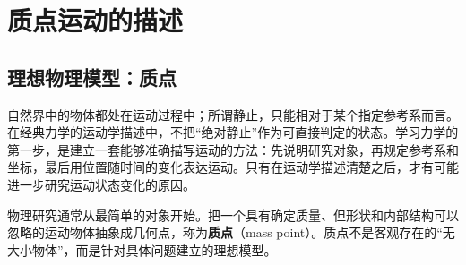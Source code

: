 \begingroup
{}
\chapter{质点运动的描述}

{
\graphicspath{{../../../sample/xes-original/kinematics-supplement/}{../../../sample/xes-original/kinematics-supplement/assets/}}
\section{理想物理模型：质点}
\newcommand{\EarthMoonScaleDiagram}{%
\begin{center}\begin{tikzpicture}[x=1cm,y=1cm,>=Latex]
  \coordinate (E) at (-5.25,0);
  \coordinate (M) at (5.25,0);
  \shade[ball color=Blue!70] (E) circle (.174);
  \shade[ball color=TextGray!45] (M) circle (.048);
  \draw[<->,TextGray] (-5.25,-.45)--(5.25,-.45)
    node[midway,clearlabel,below=2pt]
      {平均中心距 $3.84\times10^5\,\mathrm{km}$};
  \draw[TextGray] (E)--++(-.42,.58);
  \node[clearlabel,above right,align=left] at (-5.72,.55)
    {地球 $R_E\approx6.37\times10^3\,\mathrm{km}$\\$M_E\approx5.97\times10^{24}\,\mathrm{kg}$};
  \draw[TextGray] (M)--++(.35,.58);
  \node[clearlabel,above left,align=right] at (5.67,.55)
    {月球 $R_M\approx1.74\times10^3\,\mathrm{km}$\\$M_M\approx7.35\times10^{22}\,\mathrm{kg}$};
  \node[clearlabel,below] at (0,-1.05)
    {半径与中心距采用同一比例；$M_M/M_E\approx0.0123$};
\end{tikzpicture}\figcap{月球、地球及月地距离的真实比例。研究月球绕地球公转时可把月球近似为质点；研究着陆时则不能。}\label{ch02:fig:k01-2-1}\end{center}}


自然界中的物体都处在运动过程中；所谓静止，只能相对于某个指定参考系而言。在经典力学的运动学描述中，不把“绝对静止”作为可直接判定的状态。学习力学的第一步，是建立一套能够准确描写运动的方法：先说明研究对象，再规定参考系和坐标，最后用位置随时间的变化表达运动。只有在运动学描述清楚之后，才有可能进一步研究运动状态变化的原因。

物理研究通常从最简单的对象开始。把一个具有确定质量、但形状和内部结构可以忽略的运动物体抽象成几何点，称为\textbf{质点}（mass point）。质点不是客观存在的“无大小物体”，而是针对具体问题建立的理想模型。

}

